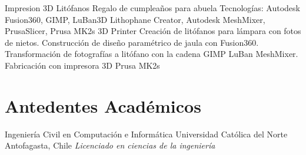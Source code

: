 \documentclass[draft,color,12pt,letterpaper,sans]{moderncv}
\begin{document}
\cventry {}
{Impresion 3D Litófanos}
{Regalo de cumpleaños para abuela}
{}
{\newline Tecnologías: Autodesk Fusion360, GIMP, LuBan3D Lithophane Creator, Autodesk MeshMixer, PrusaSlicer, Prusa MK2s 3D Printer}
{Creación de litófanos para lámpara con fotos de nietos. Construcción de diseño paramétrico de jaula con Fusion360.
Transformación de fotografías a litófano con la cadena GIMP \faArrowRight LuBan \faArrowRight MeshMixer. Fabricación con impresora 3D Prusa MK2s \newline}



\section{Antedentes Académicos}
{Ingeniería Civil en Computación e Informática}
{Universidad Católica del Norte}
{Antofagasta, Chile}
{\textit{Licenciado en ciencias de la ingeniería}}
{}
\end{document}
